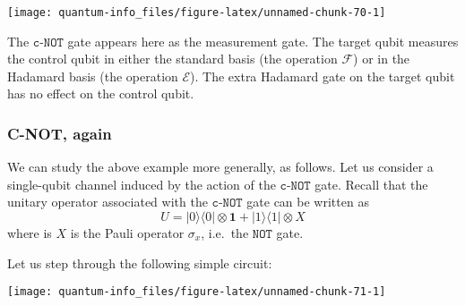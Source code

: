 \documentclass[fleqn]{article}
\begin{document}
\begin{center}\texttt{[image: quantum-info\_files/figure-latex/unnamed-chunk-70-1]} \end{center}

The \(\texttt{c-NOT}\) gate appears here as the measurement gate.
The target qubit measures the control qubit in either the standard basis (the operation \(\mathcal{F}\)) or in the Hadamard basis (the operation \(\mathcal{E}\)).
The extra Hadamard gate on the target qubit has no effect on the control qubit.

\hypertarget{c-not-again}{%
\subsubsection{C-NOT, again}\label{c-not-again}}

We can study the above example more generally, as follows.
Let us consider a single-qubit channel induced by the action of the \(\texttt{c-NOT}\) gate.
Recall that the unitary operator associated with the \(\texttt{c-NOT}\) gate can be written as
\[
  U=|0\rangle\langle 0|\otimes\mathbf{1}+ |1\rangle\langle 1|\otimes X
\]
where is \(X\) is the Pauli operator \(\sigma_x\), i.e.~the \(\texttt{NOT}\) gate.

Let us step through the following simple circuit:

\begin{center}\texttt{[image: quantum-info\_files/figure-latex/unnamed-chunk-71-1]} \end{center}
\end{document}
